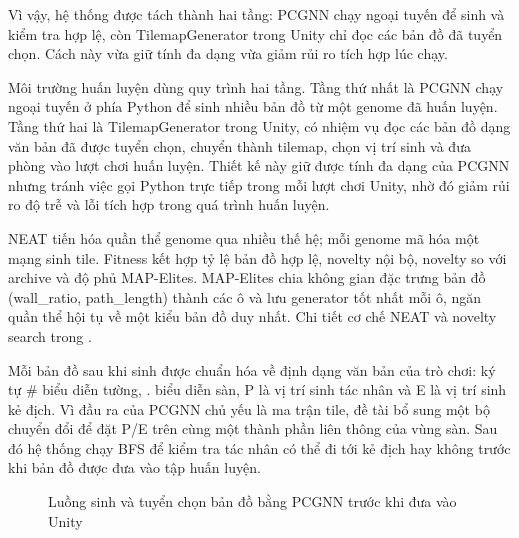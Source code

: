Vì vậy, hệ thống được tách thành hai tầng: PCGNN chạy ngoại tuyến để sinh và kiểm tra hợp lệ, còn TilemapGenerator trong Unity chỉ đọc các bản đồ đã tuyển chọn. Cách này vừa giữ tính đa dạng vừa giảm rủi ro tích hợp lúc chạy.

Môi trường huấn luyện dùng quy trình hai tầng. Tầng thứ nhất là PCGNN chạy ngoại tuyến ở phía Python để sinh nhiều bản đồ từ một genome đã huấn luyện. Tầng thứ hai là TilemapGenerator trong Unity, có nhiệm vụ đọc các bản đồ dạng văn bản đã được tuyển chọn, chuyển thành tilemap, chọn vị trí sinh và đưa phòng vào lượt chơi huấn luyện. Thiết kế này giữ được tính đa dạng của PCGNN nhưng tránh việc gọi Python trực tiếp trong mỗi lượt chơi Unity, nhờ đó giảm rủi ro độ trễ và lỗi tích hợp trong quá trình huấn luyện.

NEAT tiến hóa quần thể genome qua nhiều thế hệ; mỗi genome mã hóa một mạng sinh tile. Fitness kết hợp tỷ lệ bản đồ hợp lệ, novelty nội bộ, novelty so với archive và độ phủ MAP-Elites. MAP-Elites chia không gian đặc trưng bản đồ (wall\_ratio, path\_length) thành các ô và lưu generator tốt nhất mỗi ô, ngăn quần thể hội tụ về một kiểu bản đồ duy nhất. Chi tiết cơ chế NEAT và novelty search trong \cite{Beukman2022}.


Mỗi bản đồ sau khi sinh được chuẩn hóa về định dạng văn bản của trò chơi: ký tự \# biểu diễn tường, . biểu diễn sàn, P là vị trí sinh tác nhân và E là vị trí sinh kẻ địch. Vì đầu ra của PCGNN chủ yếu là ma trận tile, đề tài bổ sung một bộ chuyển đổi để đặt P/E trên cùng một thành phần liên thông của vùng sàn. Sau đó hệ thống chạy BFS để kiểm tra tác nhân có thể đi tới kẻ địch hay không trước khi bản đồ được đưa vào tập huấn luyện.

\begin{figure}[H]
    \centering
    \caption{Luồng sinh và tuyển chọn bản đồ bằng PCGNN trước khi đưa vào Unity}
    \label{fig:map_generation_workflow}
\end{figure}

